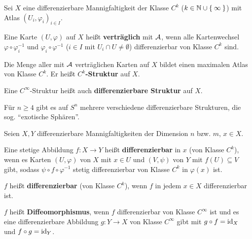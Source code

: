 \begin{definition}%
    Sei $X$ eine differenzierbare Mannigfaltigkeit der Klasse $C^k$ 
    ($k \in \mathbb{N} \cup \Set{\infty}$) mit Atlas $(U_i, \varphi_i)_{i \in I}$.

    \begin{defenum}
        \item Eine Karte $(U, \varphi)$ auf $X$ heißt \textbf{verträglich}
              mit $\mathcal{A}$, wenn alle Kartenwechsel $\varphi \circ \varphi_i^{-1}$
              und $\varphi_i \circ \varphi^{-1}$ ($i \in I$ mit $U_i \cap U \neq \emptyset$)
              differenzierbar von Klasse $C^k$ sind.
        \item Die Menge aller mit $\mathcal{A}$ verträglichen Karten auf 
              $X$ bildet einen maximalen Atlas von Klasse $C^k$. Er
              heißt \textbf{$C^k$-Struktur} auf $X$.
            
              Eine $C^\infty$-Struktur heißt auch \textbf{differenzierbare Struktur}
              auf $X$.
    \end{defenum}
\end{definition}

\begin{bemerkung}
    Für $n \geq 4$ gibt es auf $S^n$ mehrere verschiedene differenzierbare
    Strukturen, die sog. \enquote{exotische Sphären}.
\end{bemerkung}

\begin{definition}
    Seien $X, Y$ differenzierbare Mannigfaltigkeiten der Dimension
    $n$ bzw. $m$, $x \in X$.

    \begin{defenum}
        \item Eine stetige Abbildung $f:X \rightarrow Y$ heißt\label{def:stetigeAbbildungDiffbar}
              \textbf{differenzierbar}
              in $x$ (von Klasse $C^k$),
              wenn es Karten $(U, \varphi)$ von $X$ mit
              $x \in U$ und $(V, \psi)$ von $Y$ mit $f(U) \subseteq V$
              gibt, sodass $\psi \circ f \circ \varphi^{-1}$ stetig
              differenzierbar von Klasse $C^k$ in $\varphi(x)$ ist.
        \item $f$ heißt \textbf{differenzierbar}
              (von Klasse $C^k$), wenn $f$ in jedem $x \in X$ 
              differenzierbar ist.
        \item $f$ heißt \textbf{Diffeomorphismus},
              wenn $f$ differenzierbar von Klasse $C^\infty$ ist und
              es eine differenzierbare Abbildung $g: Y \rightarrow X$
              von Klasse $C^\infty$ gibt mit $g \circ f = \textnormal{id}_X$
              und $f \circ g = \textnormal{id}_Y$.
    \end{defenum}
\end{definition}

